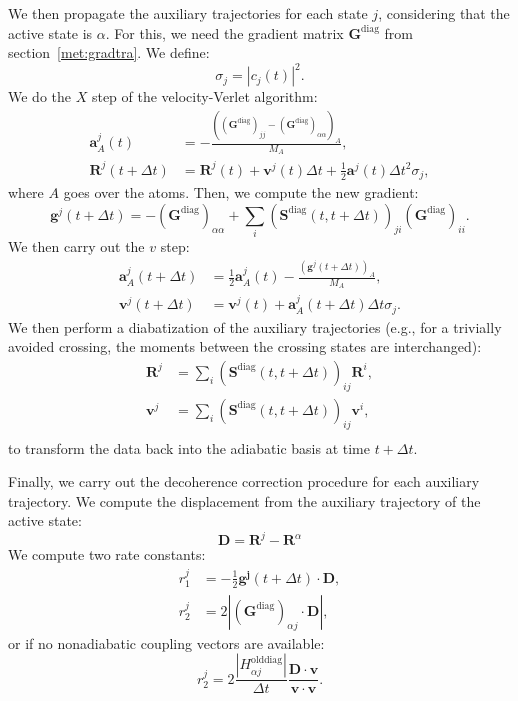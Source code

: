 \documentclass[a4paper,10pt,DIV=15,openany]{scrbook}
\newcommand{\VEC}[1]{\ensuremath{\mathbf{#1}}}
\begin{document}
We then propagate the auxiliary trajectories for each state $j$, considering that the active state is $\alpha$.
For this, we need the gradient matrix $\VEC{G}^\text{diag}$ from section~\ref{met:gradtra}.
We define:
\begin{equation}
  \sigma_j=|c_j(t)|^2.
\end{equation}
We do the $X$ step of the velocity-Verlet algorithm:
\begin{align}
  \VEC{a}^j_A(t)&=-\frac{((\VEC{G}^\text{diag})_{jj}-(\VEC{G}^\text{diag})_{\alpha\alpha})_A}{M_A},\\
  \VEC{R}^j(t+\Delta t)&= \VEC{R}^j(t)+\VEC{v}^j(t)\Delta t +\frac{1}{2}\VEC{a}^j(t)\Delta t^2\sigma_j,
\end{align}
where $A$ goes over the atoms.
Then, we compute the new gradient:
\begin{equation}
  \VEC{g}^j(t+\Delta t)=
  -(\VEC{G}^\text{diag})_{\alpha\alpha}
  +
  \sum_i(\VEC{S}^\text{diag}(t,t+\Delta t))_{ji}(\VEC{G}^\text{diag})_{ii}.
\end{equation}
We then carry out the $v$ step:
\begin{align}
  \VEC{a}^j_A(t+\Delta t)&=\frac{1}{2}\VEC{a}^j_A(t)
  -\frac{(\VEC{g}^j(t+\Delta t))_A}{M_A},\\
  \VEC{v}^j(t+\Delta t)&=\VEC{v}^j(t)+\VEC{a}^j_A(t+\Delta t)\Delta t\sigma_j.
\end{align}
We then perform a diabatization of the auxiliary trajectories (e.g., for a trivially avoided crossing, the moments between the crossing states are interchanged):
\begin{align}
  \VEC{R}^j&=\sum_i(\VEC{S}^\text{diag}(t,t+\Delta t))_{ij}\VEC{R}^i,\\
  \VEC{v}^j&=\sum_i(\VEC{S}^\text{diag}(t,t+\Delta t))_{ij}\VEC{v}^i,\\
\end{align}
to transform the data back into the adiabatic basis at time $t+\Delta t$.

Finally, we carry out the decoherence correction procedure for each auxiliary trajectory.
We compute the displacement from the auxiliary trajectory of the active state:
\begin{equation}
  \VEC{D}=\VEC{R}^j-\VEC{R}^\alpha
\end{equation}
We compute two rate constants:
\begin{align}
  r_1^j&=-\frac{1}{2}\VEC{g^j}(t+\Delta t)\cdot\VEC{D},\\
  r_2^j&=2|(\VEC{G}^\text{diag})_{\alpha j}\cdot\VEC{D}|,
\end{align}
or if no nonadiabatic coupling vectors are available:
\begin{equation}
  r_2^j=2\frac{|H^\text{olddiag}_{\alpha j}|}{\Delta t}\frac{\VEC{D}\cdot\VEC{v}}{\VEC{v}\cdot\VEC{v}}.
\end{equation}
\end{document}
